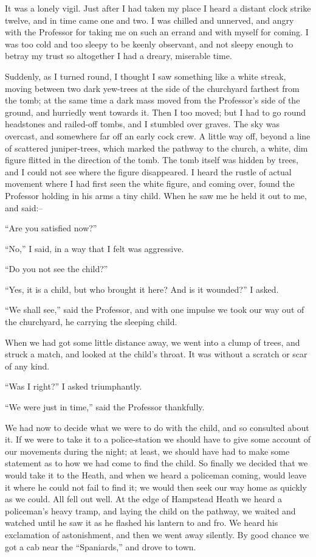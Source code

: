\documentclass[12pt,openright]{book}
\begin{document}
It was a lonely vigil. Just after I had taken my place I heard a distant clock strike twelve, and in time came one and two. I was chilled and unnerved, and angry with the Professor for taking me on such an errand and with myself for coming. I was too cold and too sleepy to be keenly observant, and not sleepy enough to betray my trust so altogether I had a dreary, miserable time.

Suddenly, as I turned round, I thought I saw something like a white streak, moving between two dark yew-trees at the side of the churchyard farthest from the tomb; at the same time a dark mass moved from the Professor’s side of the ground, and hurriedly went towards it. Then I too moved; but I had to go round headstones and railed-off tombs, and I stumbled over graves. The sky was overcast, and somewhere far off an early cock crew. A little way off, beyond a line of scattered juniper-trees, which marked the pathway to the church, a white, dim figure flitted in the direction of the tomb. The tomb itself was hidden by trees, and I could not see where the figure disappeared. I heard the rustle of actual movement where I had first seen the white figure, and coming over, found the Professor holding in his arms a tiny child. When he saw me he held it out to me, and said:–

“Are you satisfied now?”

“No,” I said, in a way that I felt was aggressive.

“Do you not see the child?”

“Yes, it is a child, but who brought it here? And is it wounded?” I asked.

“We shall see,” said the Professor, and with one impulse we took our way out of the churchyard, he carrying the sleeping child.

When we had got some little distance away, we went into a clump of trees, and struck a match, and looked at the child’s throat. It was without a scratch or scar of any kind.

“Was I right?” I asked triumphantly.

“We were just in time,” said the Professor thankfully.

We had now to decide what we were to do with the child, and so consulted about it. If we were to take it to a police-station we should have to give some account of our movements during the night; at least, we should have had to make some statement as to how we had come to find the child. So finally we decided that we would take it to the Heath, and when we heard a policeman coming, would leave it where he could not fail to find it; we would then seek our way home as quickly as we could. All fell out well. At the edge of Hampstead Heath we heard a policeman’s heavy tramp, and laying the child on the pathway, we waited and watched until he saw it as he flashed his lantern to and fro. We heard his exclamation of astonishment, and then we went away silently. By good chance we got a cab near the “Spaniards,” and drove to town.
\end{document}
